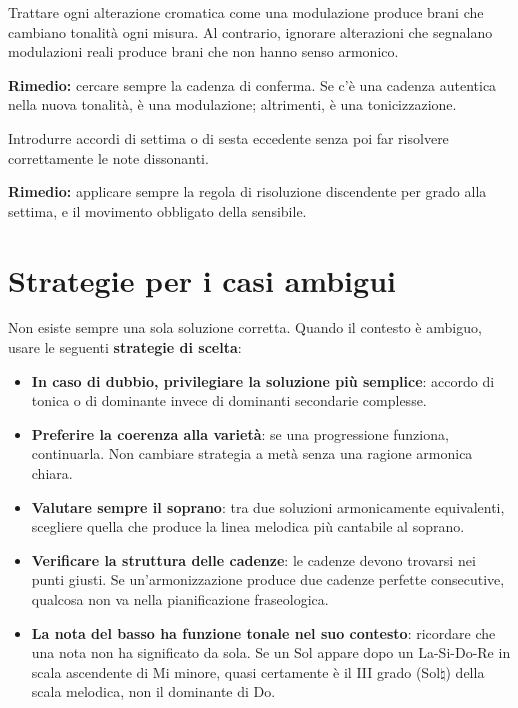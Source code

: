 \begin{errore}
	\label{err:tonicizzazione_modulazione}
	Trattare ogni alterazione cromatica come una modulazione produce brani che cambiano tonalità ogni misura. Al contrario, ignorare alterazioni che segnalano modulazioni reali produce brani che non hanno senso armonico.
	
	\textbf{Rimedio:} cercare sempre la cadenza di conferma. Se c'è una cadenza autentica nella nuova tonalità, è una modulazione; altrimenti, è una tonicizzazione.
\end{errore}

\begin{errore}
	\label{err:dissonanze_non_risolte}
	Introdurre accordi di settima o di sesta eccedente senza poi far risolvere correttamente le note dissonanti.
	
	\textbf{Rimedio:} applicare sempre la regola di risoluzione discendente per grado alla settima, e il movimento obbligato della sensibile.
\end{errore}

\section{Strategie per i casi ambigui}
\label{sec:strategie_ambigue}

Non esiste sempre una sola soluzione corretta. Quando il contesto è ambiguo, usare le seguenti \textbf{strategie di scelta}:

\begin{regola}
	\label{reg:strategie_ambiguita}
	\begin{itemize}
		\item \textbf{In caso di dubbio, privilegiare la soluzione più semplice}: accordo di tonica o di dominante invece di dominanti secondarie complesse.
		\item \textbf{Preferire la coerenza alla varietà}: se una progressione funziona, continuarla. Non cambiare strategia a metà senza una ragione armonica chiara.
		\item \textbf{Valutare sempre il soprano}: tra due soluzioni armonicamente equivalenti, scegliere quella che produce la linea melodica più cantabile al soprano.
		\item \textbf{Verificare la struttura delle cadenze}: le cadenze devono trovarsi nei punti giusti. Se un'armonizzazione produce due cadenze perfette consecutive, qualcosa non va nella pianificazione fraseologica.
		\item \textbf{La nota del basso ha funzione tonale nel suo contesto}: ricordare che una nota non ha significato da sola. Se un Sol appare dopo un La-Si-Do-Re in scala ascendente di Mi minore, quasi certamente è il III grado (Sol$\natural$) della scala melodica, non il dominante di Do.
	\end{itemize}
\end{regola}

